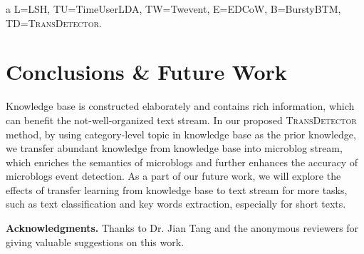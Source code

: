 \documentclass[runningheads,a4paper]{llncs}
\theoremstyle{exampstyle}
\begin{document}
\begin{table}
{\begin{threeparttable}
\begin{tablenotes}  
\item[a] L=LSH\cite{Petrovic:2010uj}, TU=TimeUserLDA\cite{Diao:2012wj}, TW=Twevent\cite{Twevent2012}, E=EDCoW\cite{Weng:2011wz}, B=BurstyBTM\cite{Yan:2015wm}, TD=\textsc{TransDetector}.
\end{tablenotes}  
\end{threeparttable}  
}
\end{table}

\section{Conclusions \& Future Work}
Knowledge base is constructed elaborately and contains rich information, which can benefit the not-well-organized text stream. 
In our proposed \textsc{TransDetector} method, by using category-level topic in knowledge base as the prior knowledge, we transfer abundant knowledge from knowledge base into microblog stream, which enriches the semantics of microblogs and further enhances the accuracy of microblogs event detection. 
As a part of our future work, we will explore the effects of transfer learning from knowledge base to text stream for more tasks, such as text classification and key words extraction, especially for short texts. 

\setlength{\parindent}{0pt}\textbf{Acknowledgments.} Thanks to Dr. Jian Tang and the anonymous reviewers for giving valuable suggestions on this work.

\small

\end{document}
